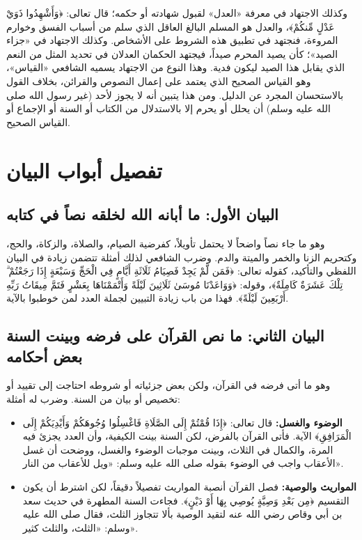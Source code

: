 وكذلك الاجتهاد في معرفة «العدل» لقبول شهادته أو حكمه؛ قال تعالى: ﴿وَأَشْهِدُوا ذَوَيْ عَدْلٍ مِّنكُمْ﴾، والعدل هو المسلم البالغ العاقل الذي سلم من أسباب الفسق وخوارم المروءة، فنجتهد في تطبيق هذه الشروط على الأشخاص.
وكذلك الاجتهاد في «جزاء الصيد»؛ كأن يصيد المحرم صيداً، فيجتهد الحكمان العدلان في تحديد المثل من النعم الذي يقابل هذا الصيد ليكون فدية. وهذا النوع من الاجتهاد يسميه الشافعي «القياس»، وهو القياس الصحيح الذي يعتمد على إعمال النصوص والقرائن، بخلاف القول بالاستحسان المجرد عن الدليل. ومن هذا يتبين أنه لا يجوز لأحد (غير رسول الله صلى الله عليه وسلم) أن يحلل أو يحرم إلا بالاستدلال من الكتاب أو السنة أو الإجماع أو القياس الصحيح.

\section{تفصيل أبواب البيان}

\subsection{البيان الأول: ما أبانه الله لخلقه نصاً في كتابه}
وهو ما جاء نصاً واضحاً لا يحتمل تأويلاً، كفرضية الصيام، والصلاة، والزكاة، والحج، وكتحريم الزنا والخمر والميتة والدم. وضرب الشافعي لذلك أمثلة تتضمن زيادة في البيان اللفظي والتأكيد، كقوله تعالى: ﴿فَمَن لَّمْ يَجِدْ فَصِيَامُ ثَلَاثَةِ أَيَّامٍ فِي الْحَجِّ وَسَبْعَةٍ إِذَا رَجَعْتُمْ ۗ تِلْكَ عَشَرَةٌ كَامِلَةٌ﴾، وقوله: ﴿وَوَاعَدْنَا مُوسَىٰ ثَلَاثِينَ لَيْلَةً وَأَتْمَمْنَاهَا بِعَشْرٍ فَتَمَّ مِيقَاتُ رَبِّهِ أَرْبَعِينَ لَيْلَةً﴾. فهذا من باب زيادة التبيين لجملة العدد لمن خوطبوا بالآية.

\subsection{البيان الثاني: ما نص القرآن على فرضه وبينت السنة بعض أحكامه}
وهو ما أتى فرضه في القرآن، ولكن بعض جزئياته أو شروطه احتاجت إلى تقييد أو تخصيص أو بيان من السنة. وضرب له أمثلة:
\begin{itemize}
    \item \textbf{الوضوء والغسل:} قال تعالى: ﴿إِذَا قُمْتُمْ إِلَى الصَّلَاةِ فَاغْسِلُوا وُجُوهَكُمْ وَأَيْدِيَكُمْ إِلَى الْمَرَافِقِ﴾ الآية. فأتى القرآن بالفرض، لكن السنة بينت الكيفية، وأن العدد يجزئ فيه المرة، والكمال في الثلاث، وبينت موجبات الوضوء والغسل، ووضحت أن غسل الأعقاب واجب في الوضوء بقوله صلى الله عليه وسلم: «ويل للأعقاب من النار».
    \item \textbf{المواريث والوصية:} فصل القرآن أنصبة المواريث تفصيلاً دقيقاً، لكن اشترط أن يكون التقسيم ﴿مِن بَعْدِ وَصِيَّةٍ يُوصِي بِهَا أَوْ دَيْنٍ﴾. فجاءت السنة المطهرة في حديث سعد بن أبي وقاص رضي الله عنه لتقيد الوصية بألا تتجاوز الثلث، فقال صلى الله عليه وسلم: «الثلث، والثلث كثير».
\end{itemize}


